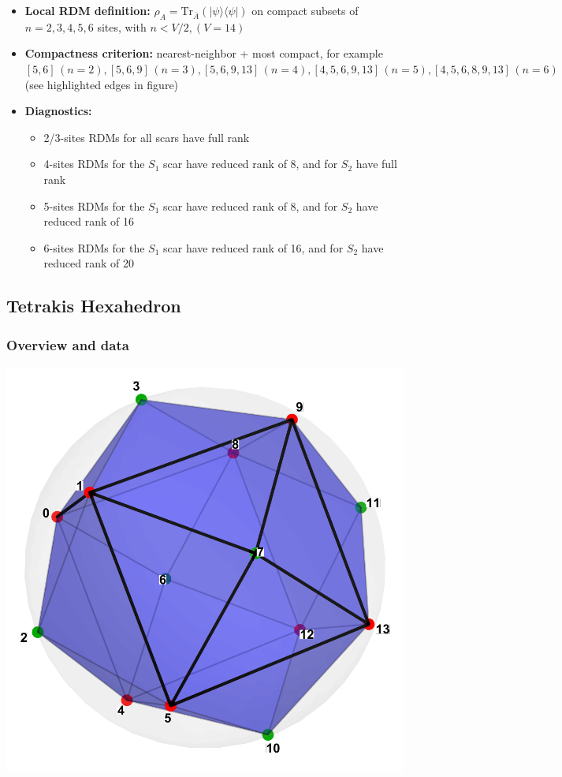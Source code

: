 \documentclass[11pt,a4paper]{article}
\begin{document}
\begin{itemize}[leftmargin=1.5em]
  \item \textbf{Local RDM definition:} $\rho_A=\mathrm{Tr}_{\bar A}(|\psi\rangle\langle\psi|)$ on compact subsets of $n=2,3,4,5,6$ sites, with $n < V/2, (V=14)$
  \item \textbf{Compactness criterion:} nearest-neighbor + most compact, for example $[5,6] \, (n = 2), [5,6,9] \, (n = 3), [5,6,9,13] \,  (n = 4), [4,5,6,9,13] \, (n = 5), [4,5,6,8,9,13] \, (n = 6)$ (see highlighted edges in figure)
  \item \textbf{Diagnostics:} \begin{itemize} \item 2/3-sites RDMs for all scars have full rank \item 4-sites RDMs for the $S_1$ scar have reduced rank of 8, and for $S_2$ have full rank \item 5-sites RDMs for the $S_1$ scar have reduced rank of 8, and for $S_2$ have reduced rank of 16 \item 6-sites RDMs for the $S_1$ scar have reduced rank of 16, and for $S_2$ have reduced rank of 20 \end{itemize}
\end{itemize}


\subsection*{Tetrakis Hexahedron}

\subsubsection*{Overview and data}
\begin{center}
  \includegraphics[width=.6\linewidth]{tetrakishexahedron}
\end{center}
\end{document}
